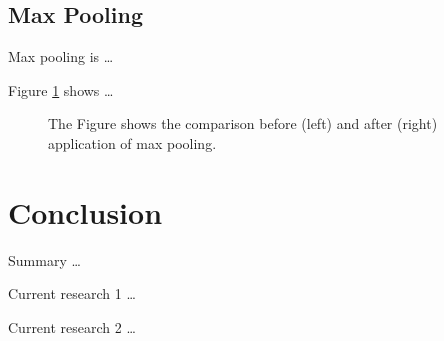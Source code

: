 \documentclass[%
	a4paper, %
	12pt, %
	english, %
	bibtotoc %
]{scrartcl}
\begin{document}
\subsection{Max Pooling}
Max pooling is  \dots

Figure \ref{fig:maxpooling} shows \dots

\begin{figure}
    \centering
    \vspace{5cm}
    \caption{The Figure shows the comparison before (left) and after (right) application of max pooling.}
    \label{fig:maxpooling}
\end{figure}


\section{Conclusion}
Summary \dots

Current research 1 \dots

Current research 2 \dots



\newpage


\end{document}
